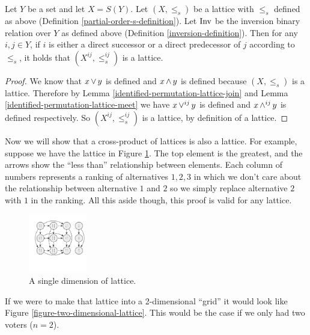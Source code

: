 	\begin{proposition}
		\label{proposition-identification-is-lattice}
		Let $Y$ be a set and let $X = S(Y)$. Let $(X, \le_s)$ be a lattice with $\le_s$ defined as above (Definition \ref{partial-order-s-definition}). Let $\operatorname{Inv}$ be the inversion binary relation over $Y$ as defined above (Definition \ref{inversion-definition}). Then for any $i,j \in Y$, if $i$ is either a direct successor or a direct predecessor of $j$ according to $\le_s$, it holds that $(X^{ij}, \le^{ij}_s)$ is a lattice.
	\end{proposition}

	\begin{proof}
		We know that $x \operatorname{\vee} y$ is defined and $x \operatorname{\wedge} y$ is defined because $(X, \le_s)$ is a lattice. Therefore by Lemma \ref{identified-permutation-lattice-join} and Lemma \ref{identified-permutation-lattice-meet} we have $x \operatorname{\vee}^{ij} y$ is defined and $x \operatorname{\wedge}^{ij} y$ is defined respectively. So $(X^{ij}, \le^{ij}_s)$ is a lattice, by definition of a lattice.
	\end{proof}

	Now we will show that a cross-product of lattices is also a lattice. For example, suppose we have the lattice in Figure \ref{figure-one-dimensional-lattice}. The top element is the greatest, and the arrows show the ``less than'' relationship between elements. Each column of numbers represents a ranking of alternatives ${1, 2, 3}$ in which we don't care about the relationship between alternative $1$ and $2$ so we simply replace alternative $2$ with $1$ in the ranking. All this aside though, this proof is valid for any lattice.

	\begin{figure}[ht]
		\begin{center}
			\includegraphics[width=1in]{../figures/diagram5.pdf}
			\caption{A single dimension of lattice.}
			\label{figure-one-dimensional-lattice}
		\end{center}
	\end{figure}

	If we were to make that lattice into a 2-dimensional ``grid'' it would look like Figure \ref{figure-two-dimensional-lattice}. This would be the case if we only had two voters ($n = 2$).

